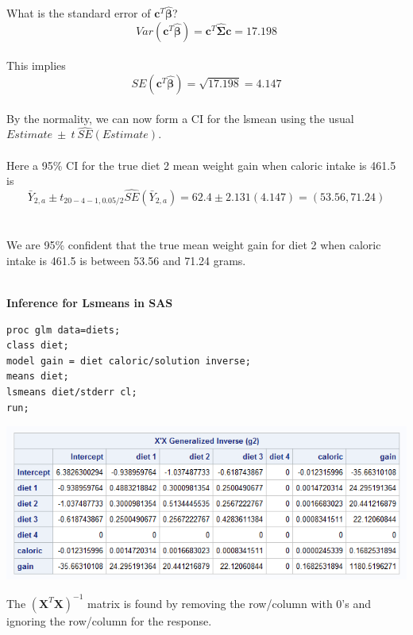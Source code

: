 What is the standard error of $\textbf{c}^{T}\hat{\boldsymbol{\beta}}$?\\
$$Var(\textbf{c}^{T}\hat{\boldsymbol{\beta}}) =\textbf{c}^{T}\hat{\boldsymbol{\Sigma}}\textbf{c} = 17.198$$~\\
This implies 
$$SE(\textbf{c}^{T}\hat{\boldsymbol{\beta}})=\sqrt{17.198}=4.147$$~\\

By the normality, we can now form a CI for the lsmean using the usual $Estimate~\pm~t~\hat{SE}(Estimate)$.\\~\\

Here a 95\% CI for the true diet 2 mean weight gain when caloric intake is 461.5 is
$$\bar{Y}_{2,a}\pm t_{20-4-1,0.05/2}\hat{SE}(\bar{Y}_{2,a}) = 62.4 \pm 2.131(4.147) = (53.56,71.24)$$\\~\\

We are 95\% confident that the true mean weight gain for diet 2 when caloric intake is 461.5 is between 53.56 and 71.24 grams.\\~\\

\newpage

\Large\textbf{Inference for Lsmeans in SAS}\large\\

\begin{small}
\begin{verbatim}
proc glm data=diets;
class diet;
model gain = diet caloric/solution inverse;
means diet;
lsmeans diet/stderr cl;
run;
\end{verbatim}
\end{small}

\begin{center}
\includegraphics[scale=0.75]{DietsInverse}
\end{center}

The $(\textbf{X}^{T}\textbf{X})^{-1}$ matrix is found by removing the row/column with 0's and ignoring the row/column for the response.

